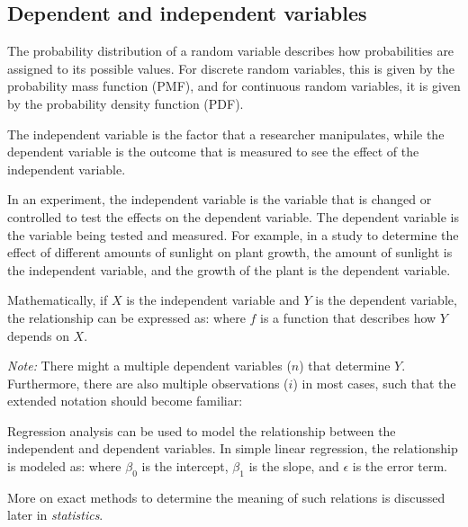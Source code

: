 \subsection{Dependent and independent variables}\label{Dependent and independent variables}
The probability distribution of a random variable describes how probabilities are assigned to its possible values. For discrete random variables, this is given by the probability mass function (PMF), and for continuous random variables, it is given by the probability density function (PDF).

The independent variable is the factor that a researcher manipulates, while the dependent variable is the outcome that is measured to see the effect of the independent variable.

In an experiment, the independent variable is the variable that is changed or controlled to test the effects on the dependent variable. The dependent variable is the variable being tested and measured. For example, in a study to determine the effect of different amounts of sunlight on plant growth, the amount of sunlight is the independent variable, and the growth of the plant is the dependent variable.

Mathematically, if $X$ is the independent variable and $Y$ is the dependent variable, the relationship can be expressed as:
where $f$ is a function that describes how $Y$ depends on $X$.

\textit{Note:} There might a multiple dependent variables ($n$) that determine $Y$. Furthermore, there are also multiple observations ($i$) in most cases, such that the extended notation should become familiar:


Regression analysis can be used to model the relationship between the independent and dependent variables. In simple linear regression, the relationship is modeled as:
where $\beta_0$ is the intercept, $\beta_1$ is the slope, and $\epsilon$ is the error term.

More on exact methods to determine the meaning of such relations is discussed later in \textit{statistics}.

